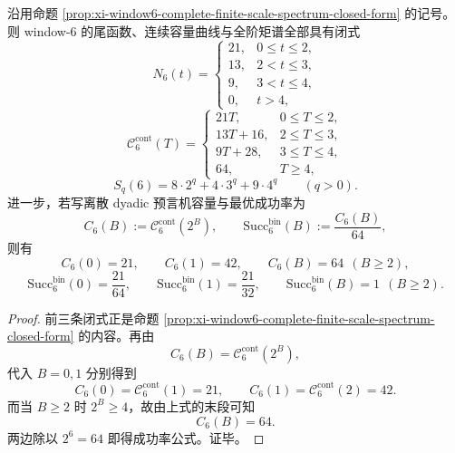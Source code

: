 \begin{theorem}\label{thm:xi-window6-oracle-geometry-completely-solvable}
沿用命题 \ref{prop:xi-window6-complete-finite-scale-spectrum-closed-form} 的记号。则 window-\(6\) 的尾函数、连续容量曲线与全阶矩谱全部具有闭式
\[
N_6(t)=
\begin{cases}
21,& 0\le t\le 2,\\
13,& 2<t\le 3,\\
9,& 3<t\le 4,\\
0,& t>4,
\end{cases}
\]
\[
\mathcal C_6^{\mathrm{cont}}(T)=
\begin{cases}
21T,& 0\le T\le 2,\\
13T+16,& 2\le T\le 3,\\
9T+28,& 3\le T\le 4,\\
64,& T\ge 4,
\end{cases}
\]
\[
S_q(6)=8\cdot 2^q+4\cdot 3^q+9\cdot 4^q
\qquad(q>0).
\]
进一步，若写离散 dyadic 预言机容量与最优成功率为
\[
C_6(B):=\mathcal C_6^{\mathrm{cont}}(2^B),
\qquad
\mathrm{Succ}_6^{\mathrm{bin}}(B):=\frac{C_6(B)}{64},
\]
则有
\[
\boxed{\;
C_6(0)=21,\qquad
C_6(1)=42,\qquad
C_6(B)=64\ \ (B\ge 2),\;}
\]
\[
\boxed{\;
\mathrm{Succ}_6^{\mathrm{bin}}(0)=\frac{21}{64},\qquad
\mathrm{Succ}_6^{\mathrm{bin}}(1)=\frac{21}{32},\qquad
\mathrm{Succ}_6^{\mathrm{bin}}(B)=1\ \ (B\ge 2).\;}
\]
\end{theorem}
\begin{proof}
前三条闭式正是命题 \ref{prop:xi-window6-complete-finite-scale-spectrum-closed-form} 的内容。再由
\[
C_6(B)=\mathcal C_6^{\mathrm{cont}}(2^B),
\]
代入 \(B=0,1\) 分别得到
\[
C_6(0)=\mathcal C_6^{\mathrm{cont}}(1)=21,
\qquad
C_6(1)=\mathcal C_6^{\mathrm{cont}}(2)=42.
\]
而当 \(B\ge 2\) 时 \(2^B\ge 4\)，故由上式的末段可知
\[
C_6(B)=64.
\]
两边除以 \(2^6=64\) 即得成功率公式。证毕。
\end{proof}







\endinput

